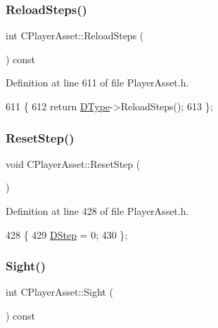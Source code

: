 \subsubsection{\texorpdfstring{Reload\+Steps()}{ReloadSteps()}}
{\footnotesize\ttfamily int C\+Player\+Asset\+::\+Reload\+Steps (\begin{DoxyParamCaption}{ }\end{DoxyParamCaption}) const\hspace{0.3cm}{\ttfamily [inline]}}



Definition at line 611 of file Player\+Asset.\+h.


\begin{DoxyCode}
611                                \{
612             \textcolor{keywordflow}{return} \hyperlink{classCPlayerAsset_a5d61f73471e1e6f0a6ab15f2ffa7b359}{DType}->ReloadSteps();
613         \};
\end{DoxyCode}
\hypertarget{classCPlayerAsset_ae94600f78d050944f4d93dcbbf8c0ee0}{}\label{classCPlayerAsset_ae94600f78d050944f4d93dcbbf8c0ee0} 
\subsubsection{\texorpdfstring{Reset\+Step()}{ResetStep()}}
{\footnotesize\ttfamily void C\+Player\+Asset\+::\+Reset\+Step (\begin{DoxyParamCaption}{ }\end{DoxyParamCaption})\hspace{0.3cm}{\ttfamily [inline]}}



Definition at line 428 of file Player\+Asset.\+h.


\begin{DoxyCode}
428                         \{
429             \hyperlink{classCPlayerAsset_a7964d2161d51b3edd66fbc9c59eba4b0}{DStep} = 0;  
430         \};
\end{DoxyCode}
\hypertarget{classCPlayerAsset_ac732622598cbd05dd2ec9233468e2b07}{}\label{classCPlayerAsset_ac732622598cbd05dd2ec9233468e2b07} 
\subsubsection{\texorpdfstring{Sight()}{Sight()}}
{\footnotesize\ttfamily int C\+Player\+Asset\+::\+Sight (\begin{DoxyParamCaption}{ }\end{DoxyParamCaption}) const\hspace{0.3cm}{\ttfamily [inline]}}



